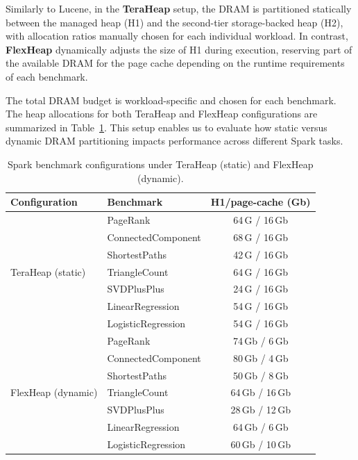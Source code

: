 Similarly to Lucene, in the \textbf{TeraHeap} setup, the DRAM is partitioned statically between the managed heap (H1) and the second-tier 
storage-backed heap (H2), with allocation ratios manually chosen for each individual workload. In contrast, \textbf{FlexHeap} 
dynamically adjusts the size of H1 during execution, reserving part of the available DRAM for the page cache depending on
the runtime requirements of each benchmark. 

The total DRAM budget is workload-specific and chosen for each benchmark.
The heap allocations for both TeraHeap and FlexHeap configurations are summarized in Table~\ref{tab:spark-benchmark-configs}.
This setup enables us to evaluate how static versus dynamic DRAM partitioning impacts performance across different Spark tasks.

\begin{table}[htbp]
\centering
\small
\renewcommand{\arraystretch}{0.8}
\caption{Spark benchmark configurations under TeraHeap (static) and FlexHeap (dynamic).}
\label{tab:spark-benchmark-configs}
\begin{tabular}{|l|l|c|}
\hline
\textbf{Configuration} & \textbf{Benchmark} & \textbf{H1/page-cache (Gb)} \\
\hline
\multirow{7}{*}{TeraHeap (static)} 
& PageRank             & 64\,G / 16\,Gb \\
& ConnectedComponent   & 68\,G / 16\,Gb \\
& ShortestPaths        & 42\,G / 16\,Gb \\
& TriangleCount        & 64\,G / 16\,Gb \\
& SVDPlusPlus          & 24\,G / 16\,Gb \\
& LinearRegression     & 54\,G / 16\,Gb \\
& LogisticRegression   & 54\,G / 16\,Gb \\
\hline
\multirow{7}{*}{FlexHeap (dynamic)} 
& PageRank             & 74\,Gb / 6\,Gb  \\
& ConnectedComponent   & 80\,Gb / 4\,Gb  \\
& ShortestPaths        & 50\,Gb / 8\,Gb \\
& TriangleCount        & 64\,Gb / 16\,Gb \\
& SVDPlusPlus          & 28\,Gb / 12\,Gb \\
& LinearRegression     & 64\,Gb / 6\,Gb \\
& LogisticRegression   & 60\,Gb / 10\,Gb \\
\hline
\end{tabular}
\end{table}

\vspace{1em} 

